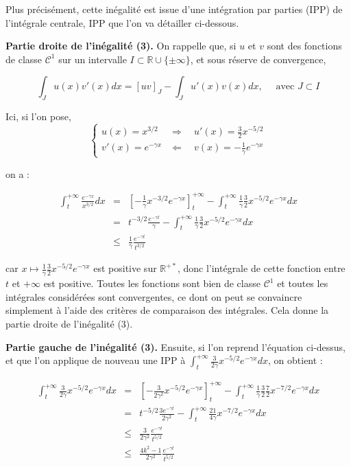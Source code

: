 \documentclass[12pt,a4paper]{article}
\begin{document}
Plus précisément, cette inégalité est issue d'une intégration par parties (IPP) de l'intégrale centrale, IPP que l'on va détailler ci-dessous.

\textbf{Partie droite de l'inégalité (3).} On rappelle que, si $u$ et $v$ sont des fonctions de classe $\mathcal{C}^1$ sur un intervalle $I \subset \mathbb{R}\cup \{\pm \infty\}$, et sous réserve de convergence,

$$ \int_J u(x) v'(x) dx = [uv]_J - \int_J u'(x)v(x) dx, \quad \text{ avec } J \subset I$$

Ici, si l'on pose, 
$$ \left\{
    \begin{array}{ll}
      u(x) = x^{3/2} & \Rightarrow \quad u'(x) = \frac{3}{2} x^{-5/2} \\
      v'(x) = e^{-\gamma x}& \Leftarrow \quad v(x) = -\frac{1}{\gamma} e^{-\gamma x}
    \end{array}
  \right.$$

on a :

\begin{eqnarray*}
    \int_t^{+\infty} \frac{e^{-\gamma x}}{x^{3/2}} dx & = & \left[ - \frac{1}{\gamma} x^{-3/2} e^{-\gamma x}\right]_t^{+\infty} - \int_t^{+\infty} \frac{1}{\gamma} \frac{3}{2} x^{-5/2} e^{-\gamma x} dx \\
    & = & t^{-3/2} \frac{e^{-\gamma t}}{\gamma} - \int_t^{+\infty} \frac{1}{\gamma} \frac{3}{2} x^{-5/2} e^{-\gamma x} dx \\
    & \leq & \frac{1}{\gamma} \frac{e^{-\gamma t}}{t^{3/2}} 
\end{eqnarray*}

car $x \mapsto \frac{1}{\gamma} \frac{3}{2} x^{-5/2} e^{-\gamma x}$ est positive sur $\mathbb{R}^{+*}$, donc l'intégrale de cette fonction entre $t$ et $+\infty$ est positive. Toutes les fonctions sont bien de classe $\mathcal{C}^1$ et toutes les intégrales considérées sont convergentes, ce dont on peut se convaincre simplement à l'aide des critères de comparaison des intégrales. Cela donne la partie droite de l'inégalité (3).

\textbf{Partie gauche de l'inégalité (3).} Ensuite, si l'on reprend l'équation ci-dessus, et que l'on applique de nouveau une IPP à $\int_t^{+\infty} \frac{3}{2\gamma} x^{-5/2} e^{-\gamma x} dx$, on obtient : 

\begin{eqnarray*}
    \int_t^{+\infty} \frac{3}{2 \gamma} x^{-5/2} e^{-\gamma x} dx & = & \left[ - \frac{3}{2\gamma^2} x^{-5/2} e^{-\gamma x}\right]_t^{+\infty} - \int_t^{+\infty} \frac{1}{\gamma} \frac{3}{2}\frac{7}{2} x^{-7/2} e^{-\gamma x} dx \\
    & = & t^{-5/2} \frac{3e^{-\gamma t}}{2\gamma^2} - \int_t^{+\infty} \frac{21}{4\gamma} x^{-7/2} e^{-\gamma x} dx \\
    & \leq & \frac{3}{2\gamma^2} \frac{e^{-\gamma t}}{t^{5/2}} \\
    & \leq & \frac{4k^2 - 1}{2\gamma^2} \frac{e^{-\gamma t}}{t^{5/2}}
\end{eqnarray*}
\end{document}
